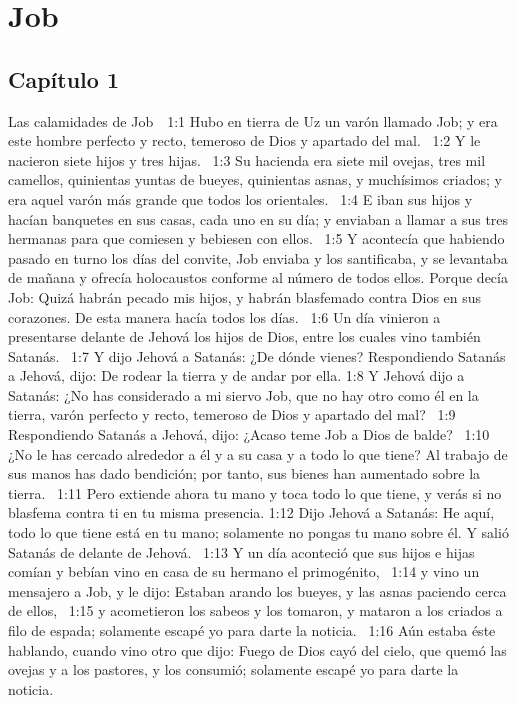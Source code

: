 \chapter{Job}
\section*{Capítulo 1 }
Las calamidades de Job  1:1 Hubo en tierra de Uz un varón llamado Job; y era este hombre perfecto y recto, temeroso de Dios y apartado del mal.  
1:2 Y le nacieron siete hijos y tres hijas.  
1:3 Su hacienda era siete mil ovejas, tres mil camellos, quinientas yuntas de bueyes, quinientas asnas, y muchísimos criados; y era aquel varón más grande que todos los orientales.  
1:4 E iban sus hijos y hacían banquetes en sus casas, cada uno en su día; y enviaban a llamar a sus tres hermanas para que comiesen y bebiesen con ellos.  
1:5 Y acontecía que habiendo pasado en turno los días del convite, Job enviaba y los santificaba, y se levantaba de mañana y ofrecía holocaustos conforme al número de todos ellos. Porque decía Job: Quizá habrán pecado mis hijos, y habrán blasfemado contra Dios en sus corazones. De esta manera hacía todos los días.  
1:6 Un día vinieron a presentarse delante de Jehová los hijos de Dios, entre los cuales vino también Satanás.  
1:7 Y dijo Jehová a Satanás: ¿De dónde vienes? Respondiendo Satanás a Jehová, dijo: De rodear la tierra y de andar por ella. 
1:8 Y Jehová dijo a Satanás: ¿No has considerado a mi siervo Job, que no hay otro como él en la tierra, varón perfecto y recto, temeroso de Dios y apartado del mal?  
1:9 Respondiendo Satanás a Jehová, dijo: ¿Acaso teme Job a Dios de balde?  
1:10 ¿No le has cercado alrededor a él y a su casa y a todo lo que tiene? Al trabajo de sus manos has dado bendición; por tanto, sus bienes han aumentado sobre la tierra.  
1:11 Pero extiende ahora tu mano y toca todo lo que tiene, y verás si no blasfema contra ti en tu misma presencia. 
1:12 Dijo Jehová a Satanás: He aquí, todo lo que tiene está en tu mano; solamente no pongas tu mano sobre él. Y salió Satanás de delante de Jehová.  
1:13 Y un día aconteció que sus hijos e hijas comían y bebían vino en casa de su hermano el primogénito,  
1:14 y vino un mensajero a Job, y le dijo: Estaban arando los bueyes, y las asnas paciendo cerca de ellos,  
1:15 y acometieron los sabeos y los tomaron, y mataron a los criados a filo de espada; solamente escapé yo para darte la noticia.  
1:16 Aún estaba éste hablando, cuando vino otro que dijo: Fuego de Dios cayó del cielo, que quemó las ovejas y a los pastores, y los consumió; solamente escapé yo para darte la noticia.  
